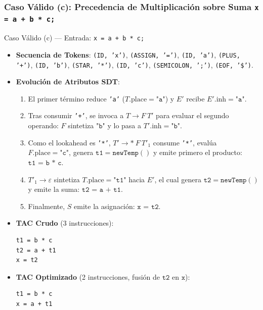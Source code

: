 \documentclass[11pt, letterpaper]{article}
\begin{document}
\subsubsection{Caso Válido (c): Precedencia de Multiplicación sobre Suma \texttt{x = a + b * c;}}
\begin{tracebox}{Caso Válido (c) --- Entrada: \texttt{x = a + b * c;}}
\begin{itemize}[leftmargin=1.5em, itemsep=2pt]
    \item \textbf{Secuencia de Tokens}: \texttt{(ID, 'x')}, \texttt{(ASSIGN, '=')}, \texttt{(ID, 'a')}, \texttt{(PLUS, '+')}, \texttt{(ID, 'b')}, \texttt{(STAR, '*')}, \texttt{(ID, 'c')}, \texttt{(SEMICOLON, ';')}, \texttt{(EOF, '\$')}.
    \item \textbf{Evolución de Atributos SDT}:
    \begin{enumerate}[leftmargin=1.5em]
        \item El primer término reduce \texttt{'a'} ($T.\text{place} = \texttt{"a"}$) y $E'$ recibe $E'.\text{inh} = \texttt{"a"}$.
        \item Tras consumir \texttt{'+'}, se invoca a $T \rightarrow F\ T'$ para evaluar el segundo operando: $F$ sintetiza $\texttt{"b"}$ y lo pasa a $T'.\text{inh} = \texttt{"b"}$.
        \item Como el lookahead es \texttt{'*'}, $T' \rightarrow \textbf{*}\ F\ T'_1$ consume \texttt{'*'}, evalúa $F.\text{place} = \texttt{"c"}$, genera $\texttt{t1} = \texttt{newTemp}()$ y emite primero el producto: $\texttt{t1 = b * c}$.
        \item $T'_1 \rightarrow \varepsilon$ sintetiza $T.\text{place} = \texttt{"t1"}$ hacia $E'$, el cual genera $\texttt{t2} = \texttt{newTemp}()$ y emite la suma: $\texttt{t2 = a + t1}$.
        \item Finalmente, $S$ emite la asignación: $\texttt{x = t2}$.
    \end{enumerate}
    \item \textbf{TAC Crudo} (3 instrucciones):
    \begin{lstlisting}[numbers=none]
t1 = b * c
t2 = a + t1
x = t2
    \end{lstlisting}
    \item \textbf{TAC Optimizado} (2 instrucciones, fusión de $\texttt{t2}$ en $\texttt{x}$):
    \begin{lstlisting}[numbers=none]
t1 = b * c
x = a + t1
    \end{lstlisting}
\end{itemize}
\end{tracebox}
\end{document}
